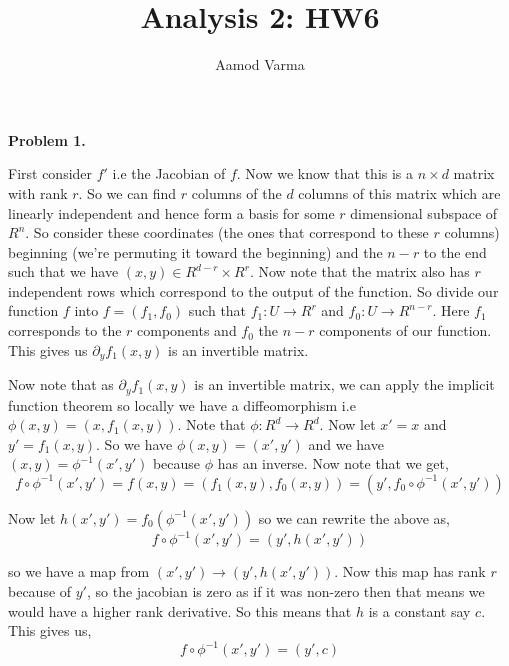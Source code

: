 \documentclass[a4paper]{article}
\title{Analysis 2: HW6}
\author{Aamod Varma}
\begin{document}
\maketitle
\textbf{Problem 1.}



First consider $f'$ i.e the Jacobian of $f$. Now we know that this is a $n \times d$ matrix with rank $r$. So we can find $r$ columns of the $d$ columns of this matrix which are linearly independent and hence form a basis for some $r$ dimensional subspace of $R^{n}$. So consider these coordinates (the ones that correspond to these $r$ columns) beginning (we're permuting it toward the beginning) and the $n - r$ to the end such that we have $(x, y) \in R^{d - r} \times R^{r}$. Now note that the matrix also has $r$ independent rows which correspond to the output of the function. So divide our function $f$ into $f = (f_{1}, f_{0})$ such that $f_{1}: U \to R^{r}$  and $f_{0}: U \to R^{n - r}$. Here $f_{1}$ corresponds to the $r$ components and $f_{0}$ the $n - r$ components of our function. This gives us $\partial_y f_{1}(x, y)$ is an invertible matrix. 

\vspace{1em}

Now note that as $\partial_y f_{1}(x, y)$ is an invertible matrix, we can apply the implicit function theorem so locally we have a diffeomorphism i.e $\phi(x, y) = (x, f_{1}(x, y))$. Note that $\phi : R^{d} \to R^{d}$. Now let $x' = x$ and $y' = f_{1}(x, y)$. So we have $\phi(x, y) = (x', y')$ and we have $(x, y) = \phi^{-1}(x', y')$ because $\phi$ has an inverse. Now note that we get, 
\[
    f \circ \phi^{-1} (x', y') = f(x, y) = (f_{1}(x, y), f_{0}(x, y))  = (y', f_{0} \circ \phi^{-1}(x', y'))
\]

Now let $h(x', y') = f_{0}(\phi^{-1}(x', y'))$ so we can rewrite the above as, 
\[
    f \circ \phi^{-1}(x', y') = (y', h(x', y'))
\]

so we have a map from $(x', y') \to (y', h(x', y'))$. Now this map has rank $r$ because of $y'$, so the jacobian is zero as if it was non-zero then that means we would have a higher rank derivative. So this means that $h$ is a constant say $c$. This gives us, 
\[
    f \circ \phi^{-1}(x', y') = (y', c)
\]
\end{document}
